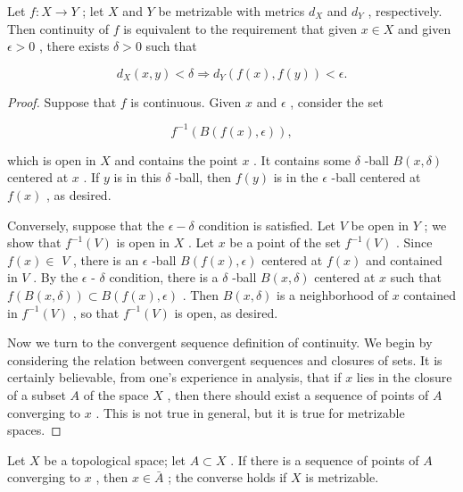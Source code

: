 \begin{theorem} Let \(f : X \rightarrow  Y\) ; let \(X\) and \(Y\) be metrizable with metrics \({d}_{X}\) and \({d}_{Y}\) , respectively. Then continuity of \(f\) is equivalent to the requirement that given \(x \in  X\) and given \(\epsilon  > 0\) , there exists \(\delta  > 0\) such that

\[
{d}_{X}\left( {x,y}\right)  < \delta  \Rightarrow  {d}_{Y}\left( {f\left( x\right) ,f\left( y\right) }\right)  < \epsilon .
\]

\end{theorem}
\begin{proof}
Suppose that \(f\) is continuous. Given \(x\) and \(\epsilon\) , consider the set

\[
{f}^{-1}\left( {B\left( {f\left( x\right) ,\epsilon }\right) }\right) ,
\]

which is open in \(X\) and contains the point \(x\) . It contains some \(\delta\) -ball \(B\left( {x,\delta }\right)\) centered at \(x\) . If \(y\) is in this \(\delta\) -ball, then \(f\left( y\right)\) is in the \(\epsilon\) -ball centered at \(f\left( x\right)\) , as desired.

Conversely, suppose that the \(\epsilon  - \delta\) condition is satisfied. Let \(V\) be open in \(Y\) ; we show that \({f}^{-1}\left( V\right)\) is open in \(X\) . Let \(x\) be a point of the set \({f}^{-1}\left( V\right)\) . Since \(f\left( x\right)  \in\)  \(V\) , there is an \(\epsilon\) -ball \(B\left( {f\left( x\right) ,\epsilon }\right)\) centered at \(f\left( x\right)\) and contained in \(V\) . By the \(\epsilon\) - \(\delta\) condition, there is a \(\delta\) -ball \(B\left( {x,\delta }\right)\) centered at \(x\) such that \(f\left( {B\left( {x,\delta }\right) }\right)  \subset  B\left( {f\left( x\right) ,\epsilon }\right)\) . Then \(B\left( {x,\delta }\right)\) is a neighborhood of \(x\) contained in \({f}^{-1}\left( V\right)\) , so that \({f}^{-1}\left( V\right)\) is open, as desired.

Now we turn to the convergent sequence definition of continuity. We begin by considering the relation between convergent sequences and closures of sets. It is certainly believable, from one’s experience in analysis, that if \(x\) lies in the closure of a subset \(A\) of the space \(X\) , then there should exist a sequence of points of \(A\) converging to \(x\) . This is not true in general, but it is true for metrizable spaces.
\end{proof}

\begin{lemma} Let \(X\) be a topological space; let \(A \subset  X\) . If there is a sequence of points of \(A\) converging to \(x\) , then \(x \in  \bar{A}\) ; the converse holds if \(X\) is metrizable.
\end{lemma}

